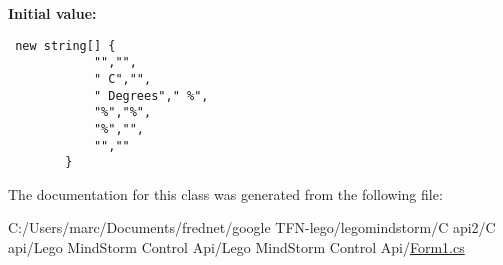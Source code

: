 \textbf{Initial value:}

\begin{Code}\begin{verbatim} new string[] {
            "","",
            " C","",
            " Degrees"," %",
            "%","%",
            "%","",
            "",""
        }
\end{verbatim}
\end{Code}


The documentation for this class was generated from the following file:\begin{CompactItemize}
\item 
C:/Users/marc/Documents/frednet/google TFN-lego/legomindstorm/C api2/C api/Lego MindStorm Control Api/Lego MindStorm Control Api/\hyperlink{_form1_8cs}{Form1.cs}\end{CompactItemize}
